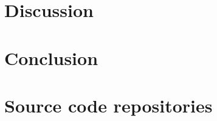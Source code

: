 \documentclass[11pt]{report}
\begin{document}
    
    
    

    \chapter{Discussion}\label{ch:discussion}

    
    
    
    
    
    

    \chapter{Conclusion}\label{ch:conclusion}

    

    \appendix

    \chapter{Source code repositories}\label{ch:source-code-repositories}

    

    \printglossary[type=\acronymtype]

    \printbibliography[heading=bibintoc]
\end{document}
